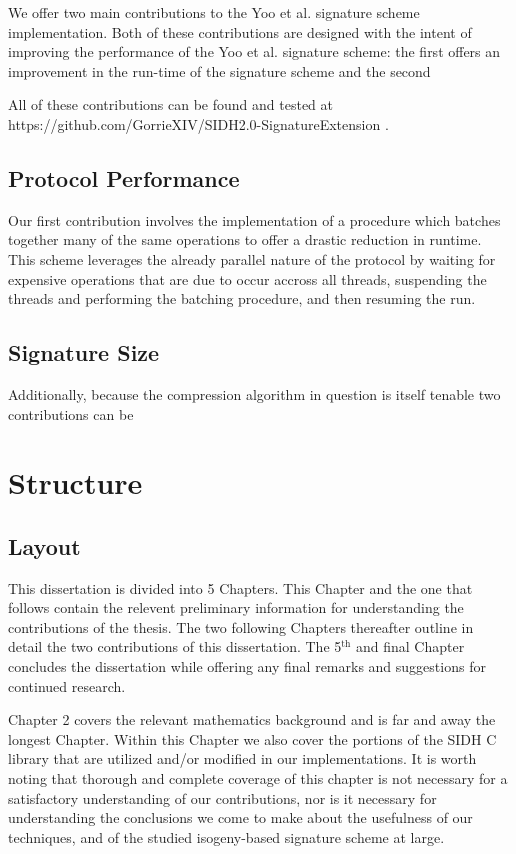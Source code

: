 We offer two main contributions to the Yoo et al. signature scheme implementation. Both of these contributions are designed with the intent of improving the performance of the Yoo et al. signature scheme: the first offers an improvement in the run-time of the signature scheme and the second 

All of these contributions can be found and tested at https://github.com/GorrieXIV/SIDH2.0-SignatureExtension .

\subsection{Protocol Performance}

Our first contribution involves the implementation of a procedure which batches together many of the same operations to offer a drastic reduction in runtime. This scheme leverages the already parallel nature of the protocol by waiting for expensive operations that are due to occur accross all threads, suspending the threads and performing the batching procedure, and then resuming the run.


\subsection{Signature Size}



Additionally, because the compression algorithm in question is itself tenable two contributions can be \\

\section{Structure}


\subsection{Layout}

This dissertation is divided into 5 Chapters. This Chapter and the one that follows contain the relevent preliminary information for understanding the contributions of the thesis. The two following Chapters thereafter outline in detail the two contributions of this dissertation. The 5$^{\text{th}}$ and final Chapter concludes the dissertation while offering any final remarks and suggestions for continued research.

Chapter 2 covers the relevant mathematics background and is far and away the longest Chapter. Within this Chapter we also cover the portions of the SIDH C library that are utilized and/or modified in our implementations. It is worth noting that thorough and complete coverage of this chapter is not necessary for a satisfactory understanding of our contributions, nor is it necessary for understanding the conclusions we come to make about the usefulness of our techniques, and of the studied isogeny-based signature scheme at large.

